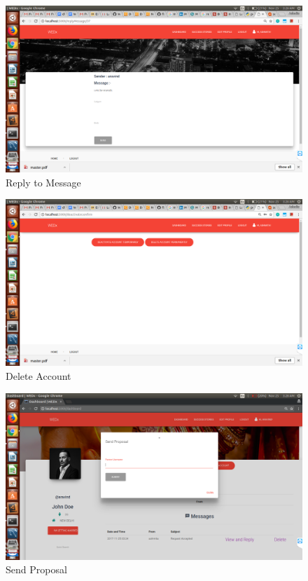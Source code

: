 \documentclass[12pt]{report}
\begin{document}
\begin{figure}[!htb]
    \centering
    \includegraphics[width=1\textwidth]{sc-18.png}
    \caption{Reply to Message}
    \label{fig:Reply to Message}
\end{figure}

\begin{figure}[!htb]
    \centering
    \includegraphics[width=1\textwidth]{sc-19.png}
    \caption{Delete Account}
    \label{fig:Delete Account}
\end{figure}

\begin{figure}[!htb]
    \centering
    \includegraphics[width=1\textwidth]{sc-20.png}
    \caption{Send Proposal}
    \label{fig:Send Proposal}
\end{figure}
\end{document}
